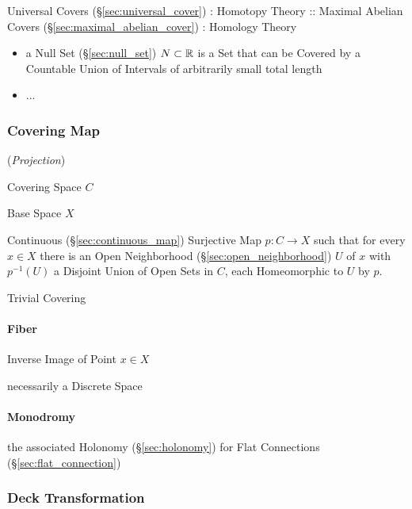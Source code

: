 Universal Covers (\S\ref{sec:universal_cover}) : Homotopy Theory ::
Maximal Abelian Covers (\S\ref{sec:maximal_abelian_cover}) : Homology
Theory

\begin{itemize}
  \item a Null Set (\S\ref{sec:null_set}) $N \subset \mathbb{R}$ is a Set that can
    be Covered by a Countable Union of Intervals of arbitrarily small total
    length
  \item ...
\end{itemize}



\subsubsection{Covering Map}\label{sec:covering_map}

(\emph{Projection})

Covering Space $C$

Base Space $X$

Continuous (\S\ref{sec:continuous_map}) Surjective Map $p : C
\rightarrow X$ such that for every $x \in X$ there is an Open
Neighborhood (\S\ref{sec:open_neighborhood}) $U$ of $x$ with
$p^{-1}(U)$ a Disjoint Union of Open Sets in $C$, each Homeomorphic to
$U$ by $p$.

Trivial Covering



\paragraph{Fiber}\label{sec:point_fiber}\hfill

Inverse Image of Point $x \in X$

necessarily a Discrete Space



\paragraph{Monodromy}\label{sec:monodromy}\hfill

\fist the associated Holonomy (\S\ref{sec:holonomy}) for Flat Connections
(\S\ref{sec:flat_connection})



\subsubsection{Deck Transformation}\label{sec:deck_transformation}

